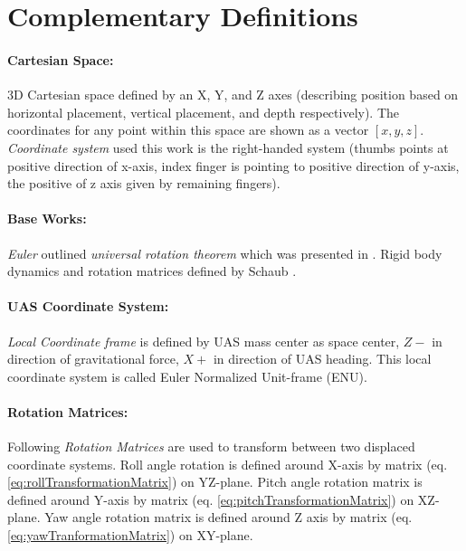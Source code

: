 \section{Complementary Definitions}\label{sec:complementsOfAlgebra}

\paragraph{Cartesian Space:} 3D Cartesian space defined by an X, Y, and Z axes (describing position based on horizontal placement, vertical placement, and depth respectively). The coordinates for any point within this space are shown as a vector $[x,y,z]$. \emph{Coordinate system} used this work is the right-handed system (thumbs points at positive direction of x-axis, index finger is pointing to positive direction of y-axis, the positive  of z axis given by remaining fingers).

\paragraph{Base Works:}\emph{Euler} outlined \emph{universal rotation theorem} which was presented in \cite{euler1775formulae}. Rigid body dynamics and rotation matrices defined by Schaub \cite{schaub2003analytical}. 

\paragraph{UAS Coordinate System:} \emph{Local Coordinate frame} is defined by UAS mass center as space center, $Z-$ in direction of gravitational force, $X+$ in direction of UAS heading. This local coordinate system is called Euler Normalized Unit-frame (ENU). 

\paragraph{Rotation Matrices:} Following \emph{Rotation Matrices} are used to transform between two displaced coordinate systems. Roll angle rotation is defined around X-axis by matrix (eq. \ref{eq:rollTransformationMatrix}) on YZ-plane. Pitch angle  rotation matrix is defined around Y-axis by matrix (eq. \ref{eq:pitchTransformationMatrix}) on XZ-plane. Yaw angle rotation matrix is defined around Z axis by matrix (eq. \ref{eq:yawTranformationMatrix}) on XY-plane.

